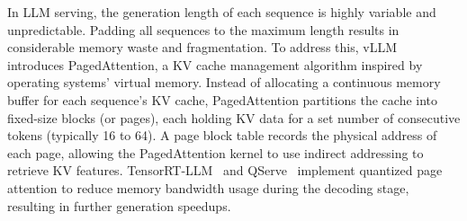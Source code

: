  In LLM serving, the generation length of each sequence is highly variable and unpredictable. Padding all sequences to the maximum length results in considerable memory waste and fragmentation. To address this, vLLM~\cite{vllm} introduces PagedAttention, a KV cache management algorithm inspired by operating systems' virtual memory. Instead of allocating a continuous memory buffer for each sequence’s KV cache, PagedAttention partitions the cache into fixed-size blocks (or pages), each holding KV data for a set number of consecutive tokens (typically 16 to 64). A page block table records the physical address of each page, allowing the PagedAttention kernel to use indirect addressing to retrieve KV features. TensorRT-LLM~\cite{trtllm} and QServe~\cite{lin2024qserve} implement quantized page attention to reduce memory bandwidth usage during the decoding stage, resulting in further generation speedups.




















